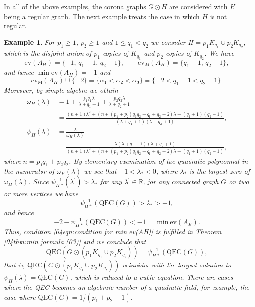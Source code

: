 \documentclass[12pt,a4paper]{article}
\newtheorem{example}[theorem]{Example}
\newcommand{\1}{{\bm 1}}
\numberwithin{equation}{section}
\begin{document}
In all of the above examples, the corona graphs
$G\odot H$ are considered with $H$ being a regular graph.
The next example treats the case in which $H$ is not regular.

\begin{example}\normalfont
For $p_1\ge1$, $p_2\ge1$ and $1\le q_1<q_2$
we consider $H=p_1K_{q_1}\cup p_2K_{q_2}$,
which is the disjoint union of $p_1$ copies of $K_{q_1}$ and
$p_2$ copies of $K_{q_2}$.
We have
\[
\mathrm{ev}(A_H)=\{-1,\,q_1-1,\,q_2-1\},
\qquad
\mathrm{ev}_M(A_H)=\{q_1-1,\,q_2-1\},
\]
and hence $\min\mathrm{ev}(A_H)=-1$ and
\[
\mathrm{ev}_{\mathrm{M}}(A_H)\cup \{-2\}
=\{\alpha_1<\alpha_2<\alpha_3\}
=\{-2<q_1-1<q_2-1\}.
\]
Moreover, by simple algebra we obtain
\begin{align*}
\omega_H(\lambda)
&=1+\frac{p_1q_1\lambda}{\lambda+q_1+1}
 +\frac{p_2q_2\lambda}{\lambda+q_2+1}
\\[6pt]
&=\frac{(n+1)\lambda^2
  +(n+(p_1+p_2)q_1q_2+q_1+q_2+2)\lambda
  +(q_1+1)(q_2+1)}
  {(\lambda+q_1+1)(\lambda+q_2+1)},
\\[6pt]
\psi_H(\lambda)
&=\frac{\lambda}{\omega_H(\lambda)}
\\[6pt]
&=\frac{\lambda(\lambda+q_1+1)(\lambda+q_2+1)}
  {(n+1)\lambda^2
  +(n+(p_1+p_2)q_1q_2+q_1+q_2+2)\lambda
  +(q_1+1)(q_2+1)},
\end{align*}
%
where $n=p_1q_1+p_2q_2$.
By elementary examination of the quadratic polynomial
in the numerator of $\omega_H(\lambda)$ we see that
$-1<\lambda_*<0$,
where $\lambda_*$ is the largest zero of $\omega_H(\lambda)$.
Since $\psi_{H*}^{-1}(\lambda^\prime)>\lambda_*$
for any $\lambda^\prime\in\mathbb{R}$, 
for any connected graph $G$ on two or more vertices
we have
\[
\psi_{H*}^{-1}(\mathrm{QEC}(G))>\lambda_*>-1,
\]
and hence
\[
-2-\psi_{H*}^{-1}(\mathrm{QEC}(G))<-1
=\min\mathrm{ev}(A_H).
\]
Thus, condition \eqref{04eqn:condition for min ev(AH)} is
fulfilled in Theorem \ref{04thm:min formula (03)}
and we conclude that
\[
\mathrm{QEC}(G\odot (p_1K_{q_1}\cup p_2K_{q_2}))
=\psi_{H*}^{-1}(\mathrm{QEC}(G)),
\]
that is,
$\mathrm{QEC}(G\odot (p_1K_{q_1}\cup p_2K_{q_2}))$
coincides with the largest solution to
$\psi_H(\lambda)=\mathrm{QEC}(G)$,
which is reduced to a cubic equation.
There are cases where the QEC 
becomes an algebraic number of a quadratic field,
for example, the case where $\mathrm{QEC}(G)=1/(p_1+p_2-1)$.
\end{example}
\end{document}
